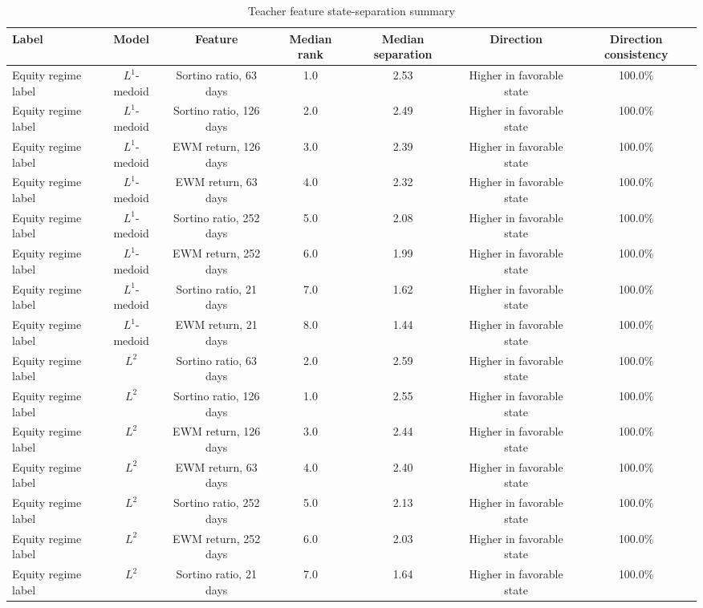 \begin{table}
\caption{Teacher feature state-separation summary}
\label{tab:app-teacher-feature-separation}
\begin{tabular}{lcccccc}
\toprule
Label & Model & Feature & Median rank & Median separation & Direction & Direction consistency \\
\midrule
Equity regime label & \(L^1\)-medoid & Sortino ratio, 63 days & 1.0 & 2.53 & Higher in favorable state & 100.0\% \\
Equity regime label & \(L^1\)-medoid & Sortino ratio, 126 days & 2.0 & 2.49 & Higher in favorable state & 100.0\% \\
Equity regime label & \(L^1\)-medoid & EWM return, 126 days & 3.0 & 2.39 & Higher in favorable state & 100.0\% \\
Equity regime label & \(L^1\)-medoid & EWM return, 63 days & 4.0 & 2.32 & Higher in favorable state & 100.0\% \\
Equity regime label & \(L^1\)-medoid & Sortino ratio, 252 days & 5.0 & 2.08 & Higher in favorable state & 100.0\% \\
Equity regime label & \(L^1\)-medoid & EWM return, 252 days & 6.0 & 1.99 & Higher in favorable state & 100.0\% \\
Equity regime label & \(L^1\)-medoid & Sortino ratio, 21 days & 7.0 & 1.62 & Higher in favorable state & 100.0\% \\
Equity regime label & \(L^1\)-medoid & EWM return, 21 days & 8.0 & 1.44 & Higher in favorable state & 100.0\% \\
Equity regime label & \(L^2\) & Sortino ratio, 63 days & 2.0 & 2.59 & Higher in favorable state & 100.0\% \\
Equity regime label & \(L^2\) & Sortino ratio, 126 days & 1.0 & 2.55 & Higher in favorable state & 100.0\% \\
Equity regime label & \(L^2\) & EWM return, 126 days & 3.0 & 2.44 & Higher in favorable state & 100.0\% \\
Equity regime label & \(L^2\) & EWM return, 63 days & 4.0 & 2.40 & Higher in favorable state & 100.0\% \\
Equity regime label & \(L^2\) & Sortino ratio, 252 days & 5.0 & 2.13 & Higher in favorable state & 100.0\% \\
Equity regime label & \(L^2\) & EWM return, 252 days & 6.0 & 2.03 & Higher in favorable state & 100.0\% \\
Equity regime label & \(L^2\) & Sortino ratio, 21 days & 7.0 & 1.64 & Higher in favorable state & 100.0\% \\

\end{tabular}
\end{table}
